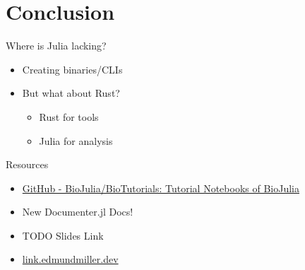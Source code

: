 \documentclass[bigger]{beamer}
\begin{document}
\section*{Conclusion}
\label{sec:org6114bc3}
\begin{frame}[label={sec:orgc23a052}]{Where is Julia lacking?}
\begin{itemize}
\item Creating binaries/CLIs
\item But what about Rust?
\begin{itemize}
\item Rust for tools
\item Julia for analysis
\end{itemize}
\end{itemize}
\end{frame}
\begin{frame}[label={sec:orge0d2f3a}]{Resources}
\begin{itemize}
\item \href{https://github.com/BioJulia/BioTutorials}{GitHub - BioJulia/BioTutorials: Tutorial Notebooks of BioJulia}
\item New Documenter.jl Docs!
\item TODO Slides Link
\item \href{https:/link.edmundmiller.dev}{link.edmundmiller.dev}
\end{itemize}
\end{frame}
\end{document}
